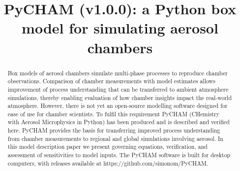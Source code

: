 \documentclass[gmd, manuscript]{copernicus}
\begin{document}
\title{PyCHAM (v1.0.0): a Python box model for simulating aerosol chambers}















\received{}
\pubdiscuss{} %
\revised{}
\accepted{}
\published{}




\maketitle



\begin{abstract}
Box models of aerosol chambers simulate multi-phase processes to reproduce chamber observations.  Comparison of chamber measurements with model estimates allows improvement of process understanding that can be transferred to ambient atmosphere simulations, thereby enabling evaluation of how chamber insights impact the real-world atmosphere.  However, there is not yet an open-source modelling software designed for ease of use for chamber scientists.  To fulfil this requirement PyCHAM (CHemistry with Aerosol Microphysics in Python) has been produced and is described and verified here.  PyCHAM provides the basis for transferring improved process understanding from chamber measurements to regional and global simulations involving aerosol.  In this model description paper we present governing equations, verification, and assessment of sensitivities to model inputs.  The PyCHAM software is built for desktop computers, with releases available at https://github.com/simonom/PyCHAM.

\end{abstract}
\end{document}
